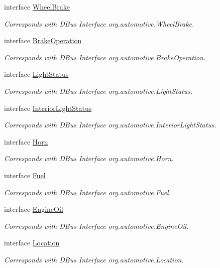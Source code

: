 \begin{DoxyCompactItemize}
interface \hyperlink{interfaceWheelBrake}{Wheel\+Brake}
\begin{DoxyCompactList}\small\item\em Corresponds with D\+Bus Interface org.\+automotive.\+Wheel\+Brake. \end{DoxyCompactList}\item 
interface \hyperlink{interfaceBrakeOperation}{Brake\+Operation}
\begin{DoxyCompactList}\small\item\em Corresponds with D\+Bus Interface org.\+automotive.\+Brake\+Operation. \end{DoxyCompactList}\item 
interface \hyperlink{interfaceLightStatus}{Light\+Status}
\begin{DoxyCompactList}\small\item\em Corresponds with D\+Bus Interface org.\+automotive.\+Light\+Status. \end{DoxyCompactList}\item 
interface \hyperlink{interfaceInteriorLightStatus}{Interior\+Light\+Status}
\begin{DoxyCompactList}\small\item\em Corresponds with D\+Bus Interface org.\+automotive.\+Interior\+Light\+Status. \end{DoxyCompactList}\item 
interface \hyperlink{interfaceHorn}{Horn}
\begin{DoxyCompactList}\small\item\em Corresponds with D\+Bus Interface org.\+automotive.\+Horn. \end{DoxyCompactList}\item 
interface \hyperlink{interfaceFuel}{Fuel}
\begin{DoxyCompactList}\small\item\em Corresponds with D\+Bus Interface org.\+automotive.\+Fuel. \end{DoxyCompactList}\item 
interface \hyperlink{interfaceEngineOil}{Engine\+Oil}
\begin{DoxyCompactList}\small\item\em Corresponds with D\+Bus Interface org.\+automotive.\+Engine\+Oil. \end{DoxyCompactList}\item 
interface \hyperlink{interfaceLocation}{Location}
\begin{DoxyCompactList}\small\item\em Corresponds with D\+Bus Interface org.\+automotive.\+Location. \end{DoxyCompactList}\item 

\end{DoxyCompactItemize}
